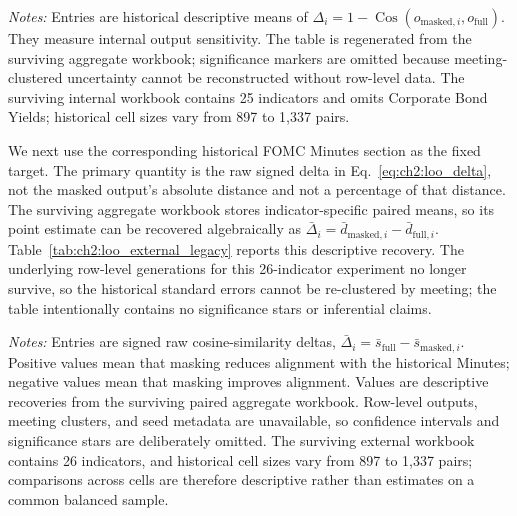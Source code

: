 \begin{table}[htbp]
\centering
\scriptsize
\begin{threeparttable}

\begin{tablenotes}[flushleft]
\footnotesize
\item \textit{Notes:} Entries are historical descriptive means of
$\Delta_i=1-\operatorname{Cos}(o_{\mathrm{masked},i},o_{\mathrm{full}})$.
They measure internal output sensitivity. The table is regenerated from the
surviving aggregate workbook; significance markers are omitted because
meeting-clustered uncertainty cannot be reconstructed without row-level data.
The surviving internal workbook contains 25 indicators and omits
Corporate Bond Yields; historical cell sizes vary from 897 to 1,337 pairs.
\end{tablenotes}
\caption{Legacy Descriptive Leave-One-Out Output Sensitivity (Target: Unmasked Generated Minutes)}
\label{tab:ch2:loo_internal_legacy}
\end{threeparttable}
\end{table}


We next use the corresponding historical FOMC Minutes section as the fixed
target. The primary quantity is the raw signed delta in
Eq.~\ref{eq:ch2:loo_delta}, not the masked output's absolute distance and not a
percentage of that distance. The surviving aggregate workbook stores
indicator-specific paired means, so its point estimate can be recovered
algebraically as
$\bar{\Delta}_i=\bar{d}_{\mathrm{masked},i}-\bar{d}_{\mathrm{full},i}$.
Table~\ref{tab:ch2:loo_external_legacy} reports this descriptive recovery.
The underlying row-level generations for this 26-indicator experiment no
longer survive, so the historical standard errors cannot be re-clustered by
meeting; the table intentionally contains no significance stars or
inferential claims.

\begin{table}[htbp]
\centering
\scriptsize
\begin{threeparttable}

\begin{tablenotes}[flushleft]
\footnotesize
\item \textit{Notes:} Entries are signed raw cosine-similarity deltas,
$\bar{\Delta}_i=\bar{s}_{\mathrm{full}}-\bar{s}_{\mathrm{masked},i}$.
Positive values mean that masking reduces alignment with the historical
Minutes; negative values mean that masking improves alignment. Values are
descriptive recoveries from the surviving paired aggregate workbook.
Row-level outputs, meeting clusters, and seed metadata are unavailable, so
confidence intervals and significance stars are deliberately omitted.
The surviving external workbook contains 26 indicators, and historical cell
sizes vary from 897 to 1,337 pairs; comparisons across cells are therefore
descriptive rather than estimates on a common balanced sample.
\end{tablenotes}
\caption{Legacy Descriptive Signed Leave-One-Out Delta against Actual FOMC Minutes}
\label{tab:ch2:loo_external_legacy}
\end{threeparttable}
\end{table}

